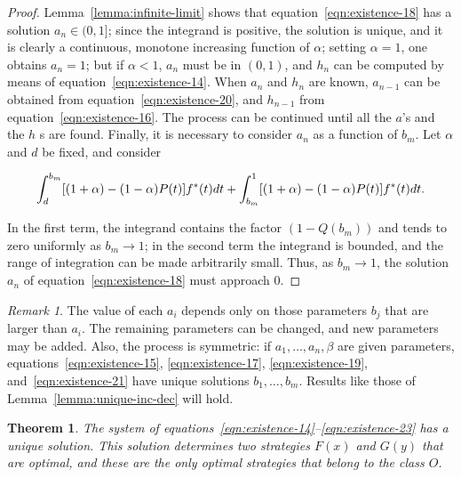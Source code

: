 \documentclass{article}
\newtheorem{theorem}{Theorem}
\theoremstyle{remark}
\newtheorem{remark}{Remark}
\begin{document}
\begin{proof}

Lemma~\ref{lemma:infinite-limit} shows that equation~\ref{eqn:existence-18} has
a solution $a_n \in (0, 1]$; since the integrand is positive, the solution is
unique, and it is clearly a continuous, monotone increasing function of
$\alpha$; setting $\alpha = 1$, one obtains $a_n = 1$; but if $\alpha < 1$,
$a_n$ must be in $(0, 1)$, and $h_n$ can be computed by means of
equation~\ref{eqn:existence-14}. When $a_n$ and $h_n$ are known, $a_{n-1}$ can
be obtained from equation~\ref{eqn:existence-20}, and $h_{n-1}$ from
equation~\ref{eqn:existence-16}. The process can be continued until all the
$a$'s and the $h$
s are found. Finally, it is necessary to consider $a_n$ as a function of $b_m$.
Let $\alpha$ and $d$ be fixed, and consider

\[
\int_{d}^{b_m} [(1 + \alpha) - (1 - \alpha) P(t)] f^*(t) dt \\
+ \int_{b_m}^{1} [(1 + \alpha) - (1 - \alpha) P(t)] f^*(t) dt.
\]

In the first term, the integrand contains the factor $(1 - Q(b_m))$ and tends
to zero uniformly as $b_m \to 1$; in the second term the integrand is bounded,
and the range of integration can be made arbitrarily small. Thus, as $b_m \to
1$, the solution $a_n$ of equation~\ref{eqn:existence-18} must approach $0$.

\end{proof}

\begin{remark}

The value of each $a_i$ depends only on those parameters $b_j$ that are larger
than $a_i$. The remaining parameters can be changed, and new parameters may be
added. Also, the process is symmetric: if $a_1, \dots, a_n, \beta$ are given
parameters, equations~\ref{eqn:existence-15}, \ref{eqn:existence-17},
\ref{eqn:existence-19}, and~\ref{eqn:existence-21} have unique solutions $b_1,
\dots, b_m$. Results like those of Lemma~\ref{lemma:unique-inc-dec} will hold.

\end{remark}

\begin{theorem}

The system of equations~\ref{eqn:existence-14}--\ref{eqn:existence-23} has a
unique solution. This solution determines two strategies $F(x)$ and $G(y)$ that
are optimal, and these are the only optimal strategies that belong to the class
$O$.

\end{theorem}
\end{document}
